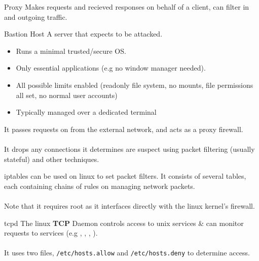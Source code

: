 \begin{definitionbox}{Proxy}
    Makes requests and recieved responses on behalf of a client, can filter in and outgoing traffic.
    \begin{itemize}
        \setlength\itemsep{0em}
    \end{itemize}
\end{definitionbox}
\begin{definitionbox}{Bastion Host}
    A server that expects to be attacked.
    \begin{itemize}
        \setlength\itemsep{0em}
        \item Runs a minimal trusted/secure OS.
        \item Only essential applications (e.g no window manager needed).
        \item All possible limits enabled (readonly file system, no mounts, file permissions all set, no normal user accounts)
        \item Typically managed over a dedicated terminal
    \end{itemize}
    It passes requests on from the external network, and acts as a proxy firewall.
    \\
    \\ It drops any connections it determines are suspect using packet filtering (usually stateful) and other techniques.
\end{definitionbox}
\begin{examplebox}{iptables}
     can be used on linux to set packet filters. It consists of several tables, each containing chains of rules on managing network packets.
    \\
    \\ Note that it requires root as it interfaces directly with the linux kernel's firewall.
\end{examplebox}
\begin{examplebox}{tcpd}
    The linux \textbf{TCP} Daemon controls access to unix services \& can monitor requests to services (e.g , , , ).
    \\
    \\ It uses two files, \lstinline{/etc/hosts.allow} and \lstinline{/etc/hosts.deny} to determine access.
\end{examplebox}

